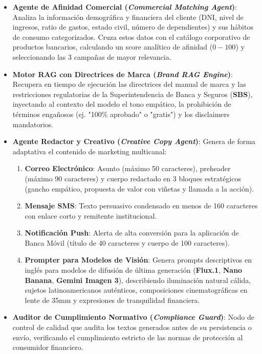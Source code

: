 \begin{itemize}
    \item \textbf{Agente de Afinidad Comercial (\textit{Commercial Matching Agent})}: Analiza la información demográfica y financiera del cliente (DNI, nivel de ingresos, ratio de gastos, estado civil, número de dependientes) y sus hábitos de consumo categorizados. Cruza estos datos con el catálogo corporativo de productos bancarios, calculando un score analítico de afinidad ($0 - 100$) y seleccionando las 3 campañas de mayor relevancia.
    \item \textbf{Motor RAG con Directrices de Marca (\textit{Brand RAG Engine})}: Recupera en tiempo de ejecución las directrices del manual de marca y las restricciones regulatorias de la Superintendencia de Banca y Seguros (\textbf{SBS}), inyectando al contexto del modelo el tono empático, la prohibición de términos engañosos (ej. "100\% aprobado" o "gratis") y los disclaimers mandatorios.
    \item \textbf{Agente Redactor y Creativo (\textit{Creative Copy Agent})}: Genera de forma adaptativa el contenido de marketing multicanal:
    \begin{enumerate}
        \item \textbf{Correo Electrónico}: Asunto (máximo 50 caracteres), preheader (máximo 90 caracteres) y cuerpo redactado en 3 bloques estratégicos (gancho empático, propuesta de valor con viñetas y llamada a la acción).
        \item \textbf{Mensaje SMS}: Texto persuasivo condensado en menos de 160 caracteres con enlace corto y remitente institucional.
        \item \textbf{Notificación Push}: Alerta de alta conversión para la aplicación de Banca Móvil (título de 40 caracteres y cuerpo de 100 caracteres).
        \item \textbf{Prompter para Modelos de Visión}: Genera prompts descriptivos en inglés para modelos de difusión de última generación (\textbf{Flux.1}, \textbf{Nano Banana}, \textbf{Gemini Imagen 3}), describiendo iluminación natural cálida, sujetos latinoamericanos auténticos, composiciones cinematográficas en lente de 35mm y expresiones de tranquilidad financiera.
    \end{enumerate}
    \item \textbf{Auditor de Cumplimiento Normativo (\textit{Compliance Guard})}: Nodo de control de calidad que audita los textos generados antes de su persistencia o envío, verificando el cumplimiento estricto de las normas de protección al consumidor financiero.
\end{itemize}

